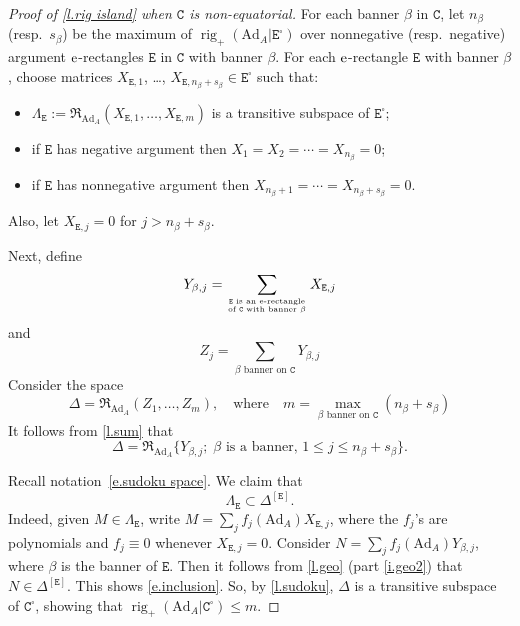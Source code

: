 \documentclass[10pt, a4paper]{amsart}
\theoremstyle{plain}
\theoremstyle{definition}
\theoremstyle{remark}
\theoremstyle{note}
\numberwithin{equation}{section}
\begin{document}
\begin{proof}[Proof of \cref{l.rig island} when ${\mathtt{C}}$ is non-equatorial]
For each banner $\beta$ in ${\mathtt{C}}$, let $n_\beta$ (resp.\ $s_\beta$) be the maximum of 
$\operatorname{rig}_+({\mathrm{Ad}}_A | {\mathtt{E}}^\square)$ over nonnegative (resp.\ negative) argument $\rm e$-rectangles ${\mathtt{E}}$ in ${\mathtt{C}}$ with banner $\beta$.
For each $\rm e$-rectangle ${\mathtt{E}}$ with banner $\beta$, 
choose matrices $X_{{\mathtt{E}},1}$, \dots, $X_{{\mathtt{E}}, n_\beta + s_\beta} \in {\mathtt{E}}^\square$ such that:
\begin{itemize}
\item $\Lambda_{\mathtt{E}} := {\mathfrak{R}}_{{\mathrm{Ad}}_A} ( X_{{\mathtt{E}},1}, \dots, X_{{\mathtt{E}}, m})$ is a transitive subspace of ${\mathtt{E}}^\square$;
\item if ${\mathtt{E}}$ has negative argument then $X_{1} = X_{2} = \cdots = X_{n_\beta} = 0$;
\item if ${\mathtt{E}}$ has nonnegative argument then $X_{n_\beta+1} = \cdots = X_{n_\beta+s_\beta} = 0$.
\end{itemize}
Also, let $X_{{\mathtt{E}}, j} = 0$ for $j>n_\beta+s_\beta$.

Next, define
\begin{equation}\label{e.Y_j}
Y_{\beta, j} = 
\sum_{\text{${\mathtt{E}}$ is an $\rm e$-rectangle}\atop\text{of ${\mathtt{C}}$ with banner $\beta$}} X_{{\mathtt{E}}, j} 
\end{equation}
and
\begin{equation}\label{e.Z_j}
Z_j = \sum_{\text{$\beta$ banner on ${\mathtt{C}}$}} Y_{\beta, j} 
\end{equation}
Consider the space 
$$
\Delta = {\mathfrak{R}}_{{\mathrm{Ad}}_A} (Z_1, \dots, Z_m), \quad 
\text{where} \quad
m = \max_{\text{$\beta$ banner on ${\mathtt{C}}$}} (n_\beta + s_\beta)
$$
It follows from \cref{l.sum} that 
$$
\Delta = {\mathfrak{R}}_{{\mathrm{Ad}}_A} \big\{Y_{\beta,j} ; \; \beta \text{ is a banner, } 1 \le j \le n_\beta + s_\beta \big\}.
$$

Recall notation~\eqref{e.sudoku space}.
We claim that 
\begin{equation}\label{e.inclusion}
\Lambda_{\mathtt{E}} \subset \Delta^{[{\mathtt{E}}]}.
\end{equation}
Indeed, given $M \in \Lambda_{\mathtt{E}}$, write 
$M = \sum_j f_j({\mathrm{Ad}}_A) X_{{\mathtt{E}}, j}$,
where the $f_j$'s are polynomials and $f_j \equiv 0$ whenever $X_{{\mathtt{E}},j}=0$.
Consider $N = \sum_j f_j({\mathrm{Ad}}_A) Y_{\beta, j}$, where $\beta$ is the banner of ${\mathtt{E}}$.
Then it follows from \cref{l.geo} (part \ref{i.geo2}) that 
$N \in \Delta^{[{\mathtt{E}}]}$. 
This shows \eqref{e.inclusion}.
So, by \cref{l.sudoku}, $\Delta$ is a transitive subspace of ${\mathtt{C}}^\square$, showing that
$\operatorname{rig}_+ ({\mathrm{Ad}}_A | {\mathtt{C}}^\square) \le m$.


\end{proof}
\end{document}
